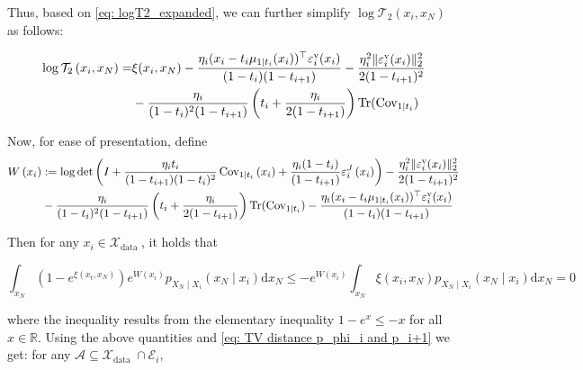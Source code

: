\documentclass{article}
\theoremstyle{plain}
\theoremstyle{definition}
\theoremstyle{remark}
\def\Norm#1{\Vert#1\Vert}
\def\Cov{\text{Cov}}
\DeclareMathOperator{\Tr}{Tr}
\begin{document}
Thus, based on \eqref{eq: logT2_expanded}, we can further simplify $\log \mathcal{T}_{2}\left(x_{i}, x_{N}\right)$ as follows:

\begin{align*}
\log \mathcal{T}_{2}\left(x_{i}, x_{N}\right)= & 
\xi(x_i, x_N)-\frac{\eta_i (x_i - t_i \mu_{1\mid t_i}(x_i))^\top \varepsilon_i^{\rm v}(x_i)}{(1-t_i)(1-t_{i+1})} - \frac{\eta_i^2 \Norm{\varepsilon_i^{\rm v}(x_i)}_2^2}{2(1-t_{i+1})^2}\\
& - \frac{\eta_i}{(1-t_i)^2 (1-t_{i+1})} \left(t_i + \frac{\eta_i}{2(1-t_{i+1})}\right) \Tr(\Cov_{1\mid t_i})
\end{align*}

Now, for ease of presentation, define
$$
\begin{aligned}
W\left(x_{i}\right) & :=\log \operatorname{det}\left( I+ \frac{\eta_i t_i}{(1-t_{i+1}) (1-t_i)^2} \operatorname{Cov}_{1 \mid t_i}\left(x_{i}\right)+ \frac{\eta_i(1-t_i)}{(1-t_{i+1})} \varepsilon_i^{J}\left(x_{i}\right)\right)
-  \frac{\eta_i^2 \Norm{\varepsilon_i^{\rm v}(x_i)}_2^2}{2(1-t_{i+1})^2} \\
& - \frac{\eta_i}{(1-t_i)^2 (1-t_{i+1})} \left(t_i + \frac{\eta_i}{2(1-t_{i+1})}\right) \Tr(\Cov_{1\mid t_i})
-
\frac{\eta_i (x_i - t_i \mu_{1\mid t_i}(x_i))^\top \varepsilon_i^{\rm v}(x_i)}{(1-t_i)(1-t_{i+1})}
\end{aligned}
$$

Then for any $x_{i} \in \mathcal{X}_{\text {data }}$, it holds that

\begin{equation}
\label{eq: integral inequality of W}
\int_{x_{N}}\left(1-e^{\xi\left(x_{t}, x_{N}\right)}\right) e^{W\left(x_{i}\right)} p_{X_{N} \mid X_{i}}\left(x_{N} \mid x_{i}\right) \mathrm{d} x_{N} \leq-e^{W\left(x_{i}\right)} \int_{x_{N}} \xi\left(x_{i}, x_{N}\right) p_{X_{N} \mid X_{i}}\left(x_{N} \mid x_{i}\right) \mathrm{d} x_{N}=0
\end{equation}

where the inequality results from the elementary inequality $1-e^{x} \leq-x$ for all $x \in \mathbb{R}$. Using the above quantities and \eqref{eq: TV distance p_phi_i and p_i+1} we get: for any $\mathcal{A} \subseteq \mathcal{X}_{\text {data }} \cap \mathcal{E}_{i}$,
\end{document}
